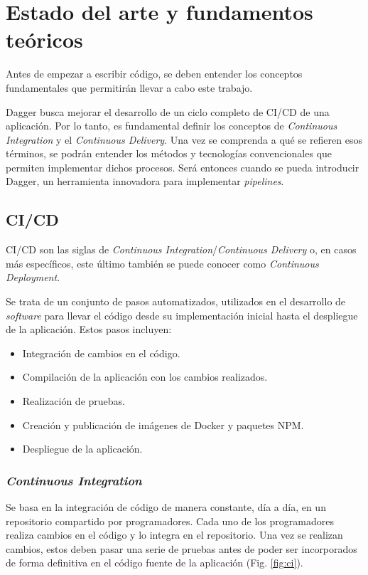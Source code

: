 \chapter{Estado del arte y fundamentos teóricos}

Antes de empezar a escribir código, se deben entender los conceptos fundamentales que permitirán llevar a cabo este trabajo.

Dagger busca mejorar el desarrollo de un ciclo completo de CI/CD de una aplicación. Por lo tanto, es fundamental definir los conceptos de \textit{Continuous Integration} y el \textit{Continuous Delivery}. Una vez se comprenda a qué se refieren esos términos, se podrán entender los métodos y tecnologías convencionales que permiten implementar dichos procesos. Será entonces cuando se pueda introducir Dagger, un herramienta innovadora para implementar \textit{pipelines}.

\section{CI/CD}

CI/CD son las siglas de \textit{Continuous Integration}/\textit{Continuous Delivery} o, en casos más específicos, este último también se puede conocer como \textit{Continuous Deployment}.

Se trata de un conjunto de pasos automatizados, utilizados en el desarrollo de \textit{software} para llevar el código desde su implementación inicial hasta el despliegue de la aplicación. Estos pasos incluyen:

\begin{itemize}
  \item Integración de cambios en el código.
  \item Compilación de la aplicación con los cambios realizados.
  \item Realización de pruebas.
  \item Creación y publicación de imágenes de Docker y paquetes NPM.
  \item Despliegue de la aplicación.
\end{itemize}

\subsection*{\textit{Continuous Integration}}
\label{subsec:CI}

Se basa en la integración de código de manera constante, día a día, en un repositorio compartido por programadores. Cada uno de los programadores realiza cambios en el código y lo integra en el repositorio. Una vez se realizan cambios, estos deben pasar una serie de pruebas antes de poder ser incorporados de forma definitiva en el código fuente de la aplicación (Fig. \ref{fig:ci}).

